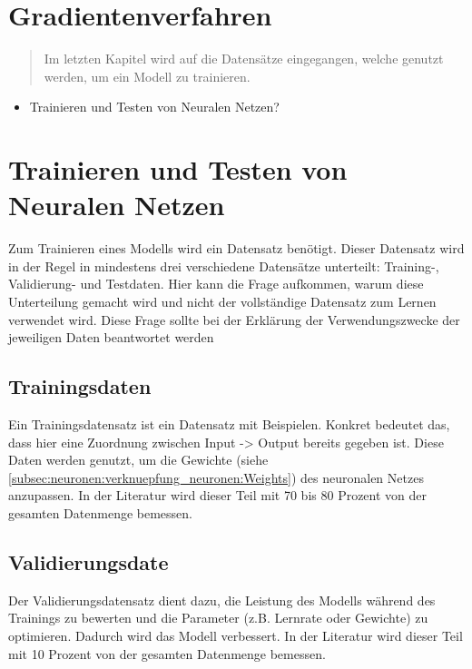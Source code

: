 \newpage
\thispagestyle{empty}
\section{Gradientenverfahren}\label{sec:gradientenverfahren}   
\begin{tcolorbox}[title={Inhalte des \textit{Gradientenverfahren}}]
  \begin{quotation}\noindent
    Im letzten Kapitel wird auf die Datensätze eingegangen, welche genutzt werden, um ein Modell zu trainieren.
  \end{quotation}
  \begin{itemize}
    \item Trainieren und Testen von Neuralen Netzen?


  \end{itemize}
\end{tcolorbox}

\section{Trainieren und Testen von Neuralen Netzen}\label{sec:trainingsdaten}   
Zum Trainieren eines Modells wird ein Datensatz benötigt. Dieser Datensatz wird in der Regel in mindestens drei verschiedene Datensätze unterteilt: Training-, Validierung- und Testdaten.
Hier kann die Frage aufkommen, warum diese Unterteilung gemacht wird und nicht der vollständige Datensatz zum Lernen verwendet wird. 
Diese Frage sollte bei der Erklärung der Verwendungszwecke der jeweiligen Daten beantwortet werden

\subsection{Trainingsdaten}
Ein Trainingsdatensatz ist ein Datensatz mit Beispielen. Konkret bedeutet das, dass hier eine Zuordnung zwischen Input -> Output bereits gegeben ist. 
Diese Daten werden genutzt, um die Gewichte (siehe \ref*{subsec:neuronen:verknuepfung_neuronen:Weights}) des neuronalen Netzes anzupassen.
In der Literatur wird dieser Teil mit 70 bis 80 Prozent von der gesamten Datenmenge bemessen.

\subsection{Validierungsdate}
Der Validierungsdatensatz dient dazu, die Leistung des Modells während des Trainings zu bewerten und die Parameter (z.B. Lernrate oder Gewichte) zu optimieren. 
Dadurch wird das Modell verbessert.
In der Literatur wird dieser Teil mit 10 Prozent von der gesamten Datenmenge bemessen.

